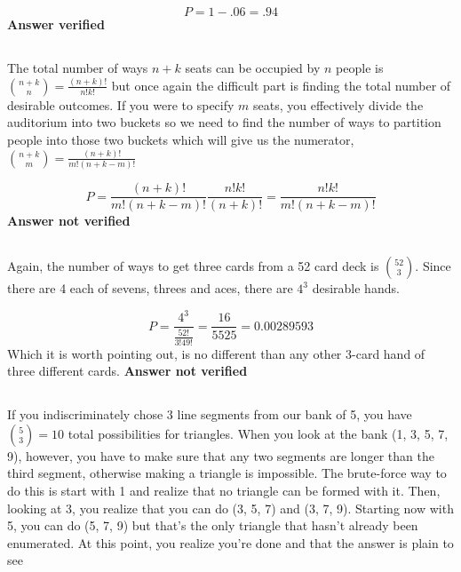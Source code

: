 \begin{equation}
	P=1-.06=.94
\label{answer1.5}
\end{equation}
\textbf{Answer verified}


\subsection{}
The total number of ways $n+k$ seats can be occupied by $n$ people is $\binom{n+k}{n}=\frac{(n+k)!}{n!k!}$ but once again the difficult part is finding the total number of desirable outcomes. If you were to specify $m$ seats, you effectively divide the auditorium into two buckets so we need to find the number of ways to partition people into those two buckets which will give us the numerator, $\binom{n+k}{m}=\frac{(n+k)!}{m!(n+k-m)!}$

\begin{equation}
	P=\frac{(n+k)!}{m!(n+k-m)!}\frac{n!k!}{(n+k)!}=\frac{{n!k!}}{m!(n+k-m)!}
\label{answer1.6}
\end{equation}
\textbf{Answer not verified}


\subsection{}

Again, the number of ways to get three cards from a 52 card deck is $\binom{52}{3}$.  Since there are 4 each of sevens, threes and aces, there are $4^3$ desirable hands.

\begin{equation}
	P=\frac{4^3}{\frac{52!}{3!49!}}=\frac{16}{5525}=0.00289593
\label{answer1.7}
\end{equation}
Which it is worth pointing out, is no different than any other 3-card hand of three different cards.
\textbf{Answer not verified}

\subsection{}
If you indiscriminately chose 3 line segments from our bank of 5, you have $\binom{5}{3}=10$ total possibilities for triangles.  When you look at the bank (1, 3, 5, 7, 9), however, you have to make sure that any two segments are longer than the third segment, otherwise making a triangle is impossible.  The brute-force way to do this is start with 1 and realize that no triangle can be formed with it.  Then, looking at 3, you realize that you can do (3, 5, 7) and (3, 7, 9).  Starting now with 5, you can do (5, 7, 9) but that's the only triangle that hasn't already been enumerated.  At this point, you realize you're done and that the answer is plain to see

